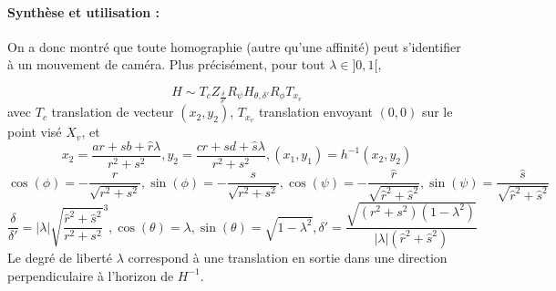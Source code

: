 %

 \paragraph{Synthèse et utilisation :}
  On a donc montré que toute homographie (autre qu'une affinité) peut s'identifier à un mouvement de caméra. Plus précisément, pour tout $\lambda \in ]0,1[$,

  \begin{equation*}
H \sim T_{c} Z_{\frac{\delta}{\delta'}}  R_{\psi}  H_{\theta,\delta'} R_{\phi}  T_{x_{v}}
  \end{equation*}
  avec $T_c$ translation de vecteur $(x_2,y_2)$, $T_{x_v}$ translation envoyant $(0,0)$ sur le point visé $X_v$, et
 \begin{equation*}
x_2=\frac{ar+sb+\hat r \lambda}{r^2 +s^2}, y_2=\frac{cr+sd+\hat s \lambda}{r^2 +s^2}, (x_1 , y_1) = h^{-1}(x_{2},y_{2})
  \end{equation*}
 \begin{equation*}
 \cos( \phi )= - \frac{r}{\sqrt{r^2 + s^2}}, \sin( \phi )= - \frac{s}{\sqrt{r^2 + s^2}},\cos( \psi ) =- \frac{\hat r}{\sqrt{\hat r^2 + \hat s^2}}, \sin( \psi ) = \frac{\hat s}{\sqrt{\hat r^2 + \hat s^2}}
 \end{equation*}
 \begin{equation*}
 \frac{\delta}{\delta'}=|\lambda|\sqrt{\frac{\hat r^2 + \hat s^2}{r^2 + s^2}}^{3}, \cos(\theta)=\lambda, \sin(\theta)=\sqrt{1-\lambda^2}, \delta'=  \frac{\sqrt{(r^2 + s^2)(1-\lambda^2)}}{|\lambda| (\hat r^2+\hat s^2)}
 \end{equation*}
 Le degré de liberté $\lambda$ correspond à une translation en sortie dans une direction perpendiculaire à l'horizon de $H^{-1}$.
 
